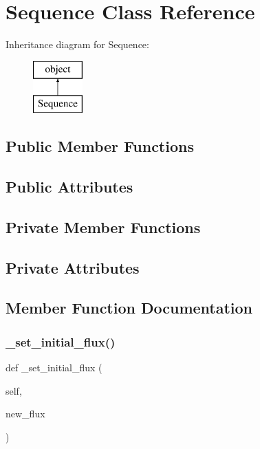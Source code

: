 \hypertarget{classopenbu_1_1sequence_1_1_sequence}{}\section{Sequence Class Reference}
\label{classopenbu_1_1sequence_1_1_sequence}
Inheritance diagram for Sequence\+:\begin{figure}[H]
\begin{center}
\leavevmode
\includegraphics[height=2.000000cm]{classopenbu_1_1sequence_1_1_sequence}
\end{center}
\end{figure}
\subsection*{Public Member Functions}
\subsection*{Public Attributes}
\subsection*{Private Member Functions}
\subsection*{Private Attributes}


\subsection{Member Function Documentation}
\mbox{\label{classopenbu_1_1sequence_1_1_sequence_aa4fed9a7ae1513bbb0db097c62569bd3}} 
\subsubsection{\texorpdfstring{\+\_\+set\+\_\+initial\+\_\+flux()}{\_set\_initial\_flux()}}
{\footnotesize\ttfamily def \+\_\+set\+\_\+initial\+\_\+flux (\begin{DoxyParamCaption}\item[{}]{self,  }\item[{}]{new\+\_\+flux }\end{DoxyParamCaption})\hspace{0.3cm}{\ttfamily [private]}}

